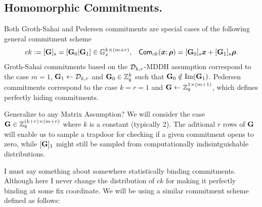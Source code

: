 \subsection{Homomorphic Commitments.}
Both Groth-Sahai and Pedersen commitments are special cases of the following general commitment scheme
\begin{align*}
&ck:=[\mathbf{{G}}]_s=[\mathbf{{G}}_0|\mathbf{{G}}_1]\in\mathbb{G}_s^{k\times (m+r)},
& \mathsf{Com}_{ck}({\boldsymbol{x}};{\boldsymbol{\rho}})=[\mathbf{{G}}_0]_s{\boldsymbol{x}}+[\mathbf{{G}}_1]_s{\boldsymbol{\rho}}.
\end{align*}
Groth-Sahai commitments based on the $\mathcal{D}_{k,r}$-MDDH assumption correspond to the case $m=1$, $\mathbf{{G}}_1\gets\mathcal{D}_{k,r}$ and $\mathbf{{G}}_0\in\mathbb{Z}_q^k$ such that $\mathbf{{G}}_0\notin\mathrm{Im}(\mathbf{{G}}_1)$. Pedersen commitments correspond to the case $k=r=1$ and $\mathbf{{G}}\gets\mathbb{Z}_q^{1\times(m+1)}$, which defines perfectly hiding commitments.

{\color{red} Generalize to any Matrix Assumption?}
We will consider the case $\mathbf{{G}}\in\mathbb{Z}_q^{(k+r)\times (m+r)}$ where $k$ is a constant (typically 2). The aditional $r$ rows of $\mathbf{{G}}$ will enable us to sample a trapdoor for checking if a given commitment opens to zero, while $[\mathbf{{G}}]_1$ might still be sampled from computationally indisintguishable distributions. 

{\color{red} I must say something about somewhere statistically binding commitments. Although here I never change the distribution of $ck$ for making it perfectly binding at some fix coordinate.} 
We will be using a similar commitment scheme defined as follows:

